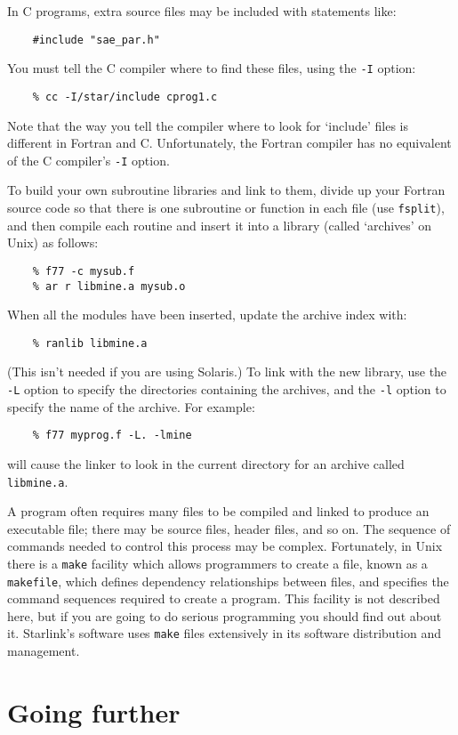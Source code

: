 In C programs, extra source files may be included with statements like:
\begin{verbatim}
    #include "sae_par.h"
\end{verbatim}
You must tell the C compiler where to find these files, using the {\tt -I}
option:
\begin{verbatim}
    % cc -I/star/include cprog1.c
\end{verbatim}
Note that the way you tell the compiler where to look for `include' files is
different in Fortran and C.
Unfortunately, the Fortran compiler has no equivalent of the C compiler's
{\tt -I} option.

To build your own subroutine libraries and link to them, divide up your
Fortran source code so that there is one subroutine or function in each file
(use {\tt fsplit}), and then compile each routine and insert it into a library
(called `archives' on Unix) as follows:
\begin{verbatim}
    % f77 -c mysub.f
    % ar r libmine.a mysub.o
\end{verbatim}
When all the modules have been inserted, update the archive index with:
\begin{verbatim}
    % ranlib libmine.a
\end{verbatim}
(This isn't needed if you are using Solaris.)
To link with the new library, use the {\tt -L} option to specify the directories
containing the archives, and the {\tt -l} option to specify the name of the
archive.
For example:
\begin{verbatim}
    % f77 myprog.f -L. -lmine
\end{verbatim}
will cause the linker to look in the current directory for an archive called
{\tt libmine.a}.

A program often requires many files to be compiled and linked to produce an
executable file; there may be source files, header files, and so on.
The sequence of commands needed to control this process may be complex.
Fortunately, in Unix there is a {\tt make} facility which allows programmers to
create a file, known as a {\tt makefile}, which defines dependency
relationships between files, and specifies the command sequences required to
create a program.
This facility is not described here, but if you are going to do serious
programming you should find out about it.
Starlink's software uses {\tt make} files extensively in its software
distribution and management.

\newpage

\section{Going further}

